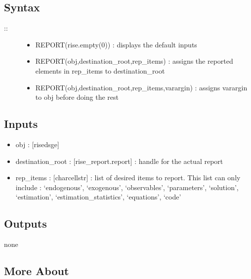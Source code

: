 \documentclass[letterpaper,10pt,english]{sphinxmanual}
\begin{document}
\subsection{Syntax}
\label{classes/models/@dsge/dsge:id167}\begin{description}
\item[{::}] \leavevmode\begin{itemize}
\item {} 
REPORT(rise.empty(0)) : displays the default inputs

\item {} 
REPORT(obj,destination\_root,rep\_items) : assigns the reported
elements in rep\_items to destination\_root

\item {} 
REPORT(obj,destination\_root,rep\_items,varargin) : assigns varargin to
obj before doing the rest

\end{itemize}

\end{description}


\subsection{Inputs}
\label{classes/models/@dsge/dsge:id168}\begin{itemize}
\item {} 
obj : {[}rise\textbar{}dsge{]}

\item {} 
destination\_root : {[}rise\_report.report{]} : handle for the actual report

\item {} 
rep\_items : {[}char\textbar{}cellstr{]} : list of desired items to report. This list
can only include : `endogenous', `exogenous', `observables',
`parameters', `solution', `estimation', `estimation\_statistics',
`equations', `code'

\end{itemize}


\subsection{Outputs}
\label{classes/models/@dsge/dsge:id169}
none


\subsection{More About}
\label{classes/models/@dsge/dsge:id170}
\end{document}
